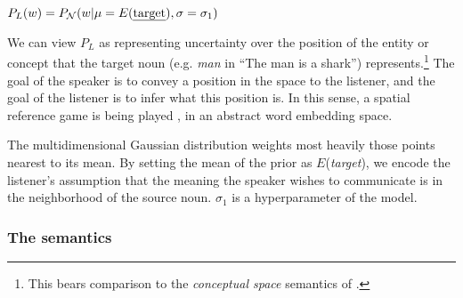 \documentclass[OpenMind]{stjour}
\begin{document}
		\begin{exe}
		\ex $P_L(w) = P_{\mathcal{N}}(w\vert\mu=E(\textrm{\emph{target}}),\sigma=\sigma_1)$ \label{vect:prior}
		\end{exe}

		We can view $P_L$ as representing uncertainty over the position of the entity or concept that the target noun (e.g. \emph{man} in ``The man is a shark'') represents.\footnote{This bears comparison to the \emph{conceptual space} semantics of \citet{gardenfors2004conceptual}.}
		The goal of the speaker is to convey a position in the space 
		to the listener, and the goal of the listener is to infer what this position is. In this sense, a spatial reference game is being played  \citep{golland2010game}, in an abstract word embedding space.

		
		


		The multidimensional Gaussian distribution weights most heavily those points nearest to its mean. By setting the mean of the prior as $E$(\emph{target}), we encode the listener's assumption that the meaning the speaker wishes to communicate is in the neighborhood of the source noun. $\sigma_1$ is a hyperparameter of the model.


			


	\subsubsection{The semantics}
\end{document}
